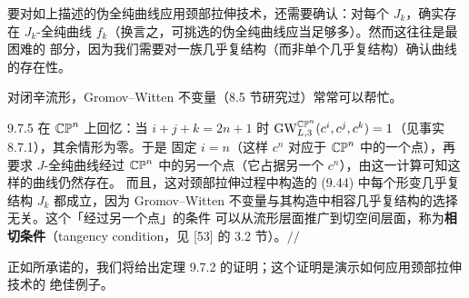 
要对如上描述的伪全纯曲线应用颈部拉伸技术，还需要确认：对每个 $J_k$，确实存在
$J_k$-全纯曲线 $f_k$（换言之，可挑选的伪全纯曲线应当足够多）。然而这往往是最困难的
部分，因为我们需要对一族几乎复结构（而非单个几乎复结构）确认曲线的存在性。

对闭辛流形，Gromov–Witten 不变量（8.5 节研究过）常常可以帮忙。

\begin{wexam}{9.7.5}
在 $\mathbb{CP}^n$ 上回忆：当 $i+j+k=2n+1$ 时
$\mathrm{GW}^{\mathbb{CP}^n}_{L,3}(c^i,c^j,c^k)=1$（见事实 8.7.1），其余情形为零。于是
固定 $i=n$（这样 $c^n$ 对应于 $\mathbb{CP}^n$ 中的一个点），再要求 $J$-全纯曲线经过
$\mathbb{CP}^n$ 中的另一个点（它占据另一个 $c^n$），由这一计算可知这样的曲线仍然存在。
而且，这对颈部拉伸过程中构造的 (9.44) 中每个形变几乎复结构 $J_k$ 都成立，因为
Gromov–Witten 不变量与其构造中相容几乎复结构的选择无关。这个「经过另一个点」的条件
可以从流形层面推广到切空间层面，称为\textbf{相切条件}（tangency condition，见 [53]
的 3.2 节）。\hfill$//$
\end{wexam}


正如所承诺的，我们将给出定理 9.7.2 的证明；这个证明是演示如何应用颈部拉伸技术的
绝佳例子。

